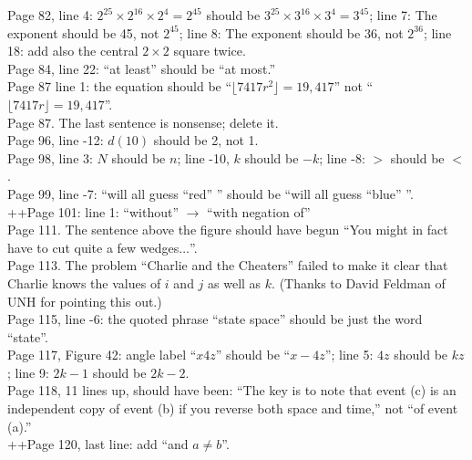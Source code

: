 \documentclass[11pt]{article}
\begin{document}
Page 82, line 4: $2^{25} \times 2^{16} \times 2^4 = 2^{45}$ should be $3^{25} \times 3^{16} \times 3^4 = 3^{45}$;
line 7: The exponent should be 45, not $2^{45}$;
line 8: The exponent should be 36, not $2^{36}$;
line 18: add also the central $2 \times 2$ square twice.\\

Page 84, line 22: ``at least'' should be ``at most.''\\

Page 87 line 1: the equation should be ``$\lfloor 7417r^2 \rfloor = 19,417$'' not
``$\lfloor 7417r \rfloor = 19,417$''. \\

Page 87.  The last sentence is nonsense; delete it.\\

Page 96, line -12: $d(10)$ should be 2, not 1.\\

Page 98, line 3: $N$ should be $n$; line -10, $k$ should be $-k$; line -8: $>$ should be $<$.\\

Page 99, line -7: ``will all guess ``red'' '' should be ``will all guess ``blue'' ''. \\

++Page 101: line 1: ``without'' $\to$ ``with negation of''\\

Page 111. The sentence above the figure should have begun ``You might in fact have to
cut quite a few wedges$\dots$''.\\

Page 113. The problem ``Charlie and the Cheaters'' failed to make it clear that Charlie knows
the values of $i$ and $j$ as well as $k$.  (Thanks to David Feldman of UNH for pointing this out.) \\

Page 115, line -6: the quoted phrase ``state space'' should be just the word ``state''. \\

Page 117, Figure 42: angle label ``$x4z$'' should be ``$x-4z$''; line 5: $4z$ should be $kz$;
line 9: $2k{-}1$ should be $2k{-}2$.\\

Page 118, 11 lines up, should have been: ``The key is to note that event (c) is an independent copy of event (b) if you reverse
both space and time,'' not ``of event (a).''\\

++Page 120, last line: add ``and $a\ne b$''.\\
\end{document}
